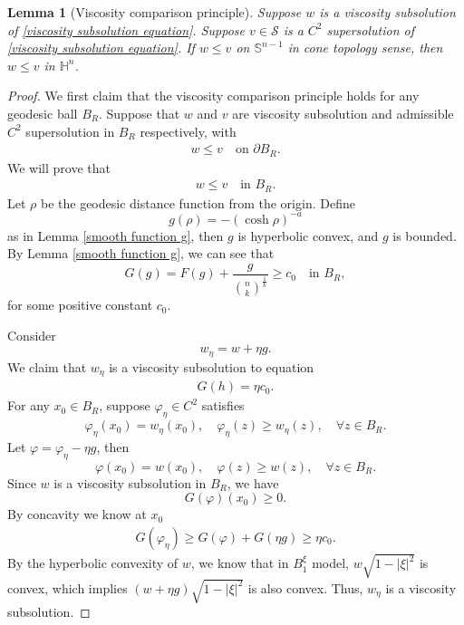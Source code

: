 \documentclass[reqno]{amsart}
\newtheorem{lemma}[theorem]{Lemma}
\theoremstyle{remark}
\theoremstyle{definition}
\numberwithin{equation}{section}
\begin{document}
\begin{lemma}[Viscosity comparison principle]\label{Viscosity comparison principle}
    Suppose $w$ is a viscosity subsolution of \eqref{viscosity subsolution equation}.
    Suppose $v \in \mathcal{S}$ is a $C^2$ supersolution of \eqref{viscosity subsolution equation}.
    If $w \leqslant v$ on $\mathbb{S}^{n-1}$ in cone topology sense, then $w \leqslant v$ in $\mathbb{H}^{n}$.
\end{lemma}
\begin{proof}
    We first claim that the viscosity comparison principle holds for any geodesic ball $B_R$. Suppose that $w$ and $v$ are viscosity subsolution and admissible $C^2$ supersolution in $B_R$ respectively, with
    \begin{align}
        w \leqslant v \quad \text{on } \partial B_R. 
    \end{align}
    We will prove that
    \begin{align}
        w \leqslant v \quad \text{in } B_R. \label{BR leq}
    \end{align}
    Let $\rho$ be the geodesic distance function from the origin. Define
    \[
    g(\rho) = - \left( \cosh \rho \right)^{-a}
    \]
    as in Lemma \ref{smooth function g}, then $g$ is hyperbolic convex, and $g$ is bounded. By Lemma \ref{smooth function g}, we can see that    
    \[
    G(g)=F(g) + \frac{g}{\binom{n}{k}^{\frac{1}{k}}}\geqslant c_0 \quad \text{in } B_R,
    \]
    for some positive constant $c_0$. 
 
    Consider 
    \[
    w_\eta = w + \eta g.
    \]
    We claim that $w_\eta$ is a viscosity subsolution to equation
    \begin{align}\label{Modified subsolution}
        G(h) = \eta c_0.
    \end{align}
    For any $x_0 \in B_R$, suppose  $\varphi_{\eta} \in C^2$ satisfies 
    \[
    \varphi_{\eta}(x_0) = w_{\eta}(x_0), \quad \varphi_{\eta}(z) \geqslant w_{\eta}(z), \quad \mathbb\forall z \in B_R.
    \]
    Let $\varphi = \varphi_{\eta} - \eta g$, then
    \[
    \varphi(x_0) = w(x_0), \quad \varphi(z) \geqslant w(z), \quad \mathbb\forall z \in B_R.
    \]
    Since $w$ is a viscosity subsolution in $B_R$, we have
    \[
    G(\varphi)(x_0) \geqslant 0.
    \]
    By concavity we know at $x_0$
    \begin{align*}
        G(\varphi_{\eta}) \geqslant G(\varphi) + G(\eta g) \geqslant \eta c_0.
    \end{align*}
    By the hyperbolic convexity of $w$, we know that in $B_1^\xi$ model, $w \sqrt{1-|\xi|^2}$ is convex, which implies 
    $(w +\eta g)\sqrt{1-|\xi|^2}$ is also convex. Thus, $w_{\eta}$ is a viscosity subsolution.     
    

\end{proof}
\end{document}
